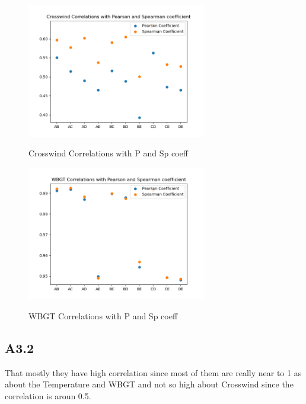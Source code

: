 \documentclass[a4paper,12pt]{article}
\begin{document}
 \begin{figure}[H] 
 	\centering
 	\includegraphics[width=0.7\textwidth]{Crosswind Correlations with P and Sp coeff.png}
 	\caption{Crosswind Correlations with P and Sp coeff}\cite{Maiullari2020}
 \end{figure}
 \begin{figure}[H] 
 	\centering
 	\includegraphics[width=0.7\textwidth]{WBGT Correlations with P and Sp coeff.png}
 	\caption{WBGT Correlations with P and Sp coeff}\cite{Maiullari2020}
 \end{figure}
 \subsection{A3.2}
That mostly they have high correlation since most of them are really near to 1 as about the Temperature and WBGT and not so high about Crosswind since the correlation is aroun 0.5.
\end{document}
